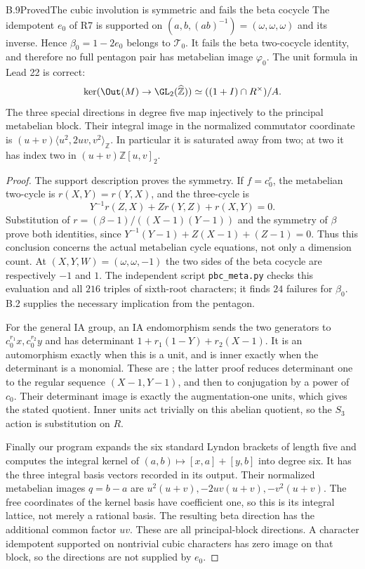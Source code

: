 \begin{statement}{B.9}{Proved}{The cubic involution is symmetric and fails the beta cocycle}
The idempotent $e_0$ of R7 is supported on
$(a,b,(ab)^{-1})=(\omega,\omega,\omega)$ and its inverse.
Hence $\beta_0=1-2e_0$ belongs to $\mathcal T_0$.
It fails the beta two-cocycle identity, and therefore no full
pentagon pair has metabelian image $\varphi_0$.
The unit formula in Lead 22 is correct:
\[
 \ker(\Out(M)\to\GL_2(\widehat{\mathbb Z}))
              \simeq ((1+I)\cap R^\times)/A.
\]
The three special directions in degree five map injectively to the
principal metabelian block. Their integral image in the normalized
commutator coordinate is
$(u+v)\langle u^2,2uv,v^2\rangle_{\mathbb Z}$.
In particular it is saturated away from two; at two it has index
two in $(u+v)\mathbb Z[u,v]_2$.
\end{statement}
\begin{proof}
The support description proves the symmetry. If $f=c_0^r$, the
metabelian two-cycle is $r(X,Y)=r(Y,X)$, and the three-cycle is
\[
 Y^{-1}r(Z,X)+Zr(Y,Z)+r(X,Y)=0.
\]
Substitution of $r=(\beta-1)/((X-1)(Y-1))$ and the symmetry of
$\beta$ prove both identities, since
$Y^{-1}(Y-1)+Z(X-1)+(Z-1)=0$. Thus this conclusion concerns the
actual metabelian cycle equations, not only a dimension count.
At $(X,Y,W)=(\omega,\omega,-1)$ the two sides of the beta cocycle
are respectively $-1$ and $1$. The independent script
\texttt{pbc\_meta.py} checks this evaluation and all $216$ triples
of sixth-root characters; it finds $24$ failures for $\beta_0$.
B.2 supplies the necessary implication from the pentagon.

For the general IA group, an IA endomorphism sends the two
generators to $c_0^{r_1}x,c_0^{r_2}y$ and has determinant
$1+r_1(1-Y)+r_2(X-1)$. It is an automorphism exactly when this is
a unit, and is inner exactly when the determinant is a monomial.
These are \cite[Propositions 4.3.5 and 4.3.7]{PBC_ChenDeligne2017};
the latter proof reduces determinant one to the regular sequence
$(X-1,Y-1)$, and then to conjugation by a power of $c_0$.
Their determinant image is exactly the augmentation-one units,
which gives the stated quotient. Inner units act trivially on
this abelian quotient, so the $S_3$ action is substitution on $R$.

Finally our program expands the six standard Lyndon brackets of
length five and computes the integral kernel of
$(a,b)\mapsto[x,a]+[y,b]$ into degree six. It has the three
integral basis vectors recorded in its output. Their normalized
metabelian images $q=b-a$ are
$u^2(u+v),-2uv(u+v),-v^2(u+v)$.
The free coordinates of the kernel basis have coefficient one,
so this is its integral lattice, not merely a rational basis.
The resulting beta direction has the additional common factor
$uv$. These are all principal-block directions. A character
idempotent supported on nontrivial cubic characters has zero
image on that block, so the directions are not supplied by $e_0$.
\end{proof}

